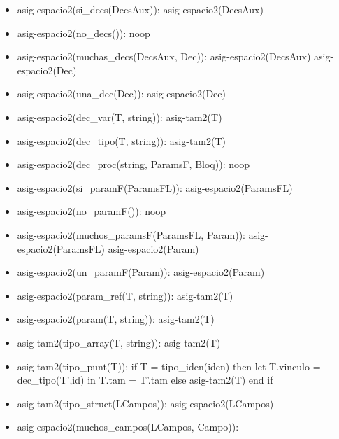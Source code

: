 \documentclass[11pt]{article}
\begin{document}
        \begin{itemize}
            \item asig-espacio2(si\_decs(DecsAux)): 
                \subitem asig-espacio2(DecsAux)
            \item asig-espacio2(no\_decs()): 
                \subitem noop
            \item asig-espacio2(muchas\_decs(DecsAux, Dec)): 
                \subitem asig-espacio2(DecsAux)
                \subitem asig-espacio2(Dec)
            \item asig-espacio2(una\_dec(Dec)): 
                \subitem asig-espacio2(Dec)
            \item asig-espacio2(dec\_var(T, string)): 
                \subitem asig-tam2(T)
            \item asig-espacio2(dec\_tipo(T, string)): 
                \subitem asig-tam2(T)
            \item asig-espacio2(dec\_proc(string, ParamsF, Bloq)): 
                \subitem noop
            \item asig-espacio2(si\_paramF(ParamsFL)): 
                \subitem asig-espacio2(ParamsFL)
            \item asig-espacio2(no\_paramF()): 
                \subitem noop
            \item asig-espacio2(muchos\_paramsF(ParamsFL, Param)): 
                \subitem asig-espacio2(ParamsFL)
                \subitem asig-espacio2(Param)
            \item asig-espacio2(un\_paramF(Param)): 
                \subitem asig-espacio2(Param) 
            \item asig-espacio2(param\_ref(T, string)): 
                \subitem asig-tam2(T)
            \item asig-espacio2(param(T, string)): 
                \subitem asig-tam2(T)
            \item asig-tam2(tipo\_array(T, string)): 
                \subitem asig-tam2(T)
            \item asig-tam2(tipo\_punt(T)): 
                \subitem if T = tipo\_iden(iden) then
                    \subsubitem let T.vinculo = dec\_tipo(T’,id) in
                    \subsubitem T.tam = T’.tam
                \subitem else
                    \subsubitem asig-tam2(T)
                \subitem end if
            \item asig-tam2(tipo\_struct(LCampos)): 
                \subitem asig-espacio2(LCampos)
            \item asig-espacio2(muchos\_campos(LCampos, Campo)): 

\end{itemize}
\end{document}
